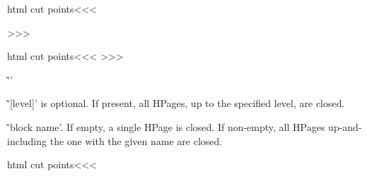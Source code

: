 {{\<html cut points\><<<
\def\HPageButton{\strt:bt\ch:bbtf}
\def\ch:bbtf{\ifx -\:temp \expandafter\op:bbft
             \else \expandafter\:bbtf \fi}
\def\:bbtf[#1]#2{%
   \:hookI{BeforeHPageButton}{}{#2}%
   \hpg:wrn{#1}{#2}\HPageButton
   \TagFile{|<fr bt fl|>\:temp}%
   \edef\HP:file{\RefFile\:temp}%
   \def\:temp{#2}\ifx \:temp\empty 
   \else  \HP:Link#2\EndLink  \fi
   \:hookI{AfterHPageButton}{}{#2}%
   \csname AfterHPage\endcsname  }

\def\op:bbft#1[#2]{%
   \:hookI{BeforeHPageButton}{}{}%
   \edef\:temp{#2}%
   \ifx \:temp\empty \:warning{\string\HPageButton-[]?}\fi
   \TagFile{|<fr bt fl|>\:temp}%
   \edef\HP:file{\RefFile\:temp}%
   \HP:Link%
   \def\ContHPage{\EndLink
      \:hookI{AfterHPageButton}{}{}%
      \csname AfterHPage\endcsname  }}
>>>


\<html cut points\><<<
\def\BeginHPage{\futurelet\:temp\ch:bbbt}
\def\ch:bbbt{%
   |<entring file of hpage|>%
   \NewFileName\HP:file   \Save:Link\HP:file 
   \ifx -\:temp  \expandafter\op:bbbt
   \else         \expandafter\:bbbt   \fi}
\def\:bbbt[#1]#2{%
   \PushStack\:btid{#1}%
   \:btfile{#2}%
   \:buttrc\BeginHPage{[#1]{#2}}%
   \PushStack\:afterbt\empty 
   \hpg:wrn{#1}{#2}\BeginHPage    \Save:HPageTag\:temp
   \Save:HPage{#2}%
   \TagFile{\:temp}}
\def\op:bbbt#1[#2]{%
   \PushStack\:btid{#2}%
   \:hookI{AfterHPageButton}{}{}%
   \:btfile{}%
   \:buttrc\BeginHPage{[#2]}%
   \PushStack\:afterbt\empty    \edef\:temp{#2}%
   \ifx \:temp\empty \:warning{\string\BeginHPage-[]?}\fi
   \Save:HPageTag\:temp   \Save:HPage{}%
   \TagFile{\:temp}}
>>>






\`''

\List{$\bullet$}

\item \`'[level]' is optional. If present, all HPages, up to the
specified level, are closed.

\item \`'block name'. If empty, a single HPage is closed. If
non-empty, all HPages up-and-including the one with the given name
are closed.

\EndList

\<html cut points\><<<
\def\EndHPage{\futurelet\:temp\chEnd:HPage}
\def\chEnd:HPage{\ifx  [\:temp  \expandafter\opEnd:HPage
              \else          \expandafter\End:HPage   \fi}
\def\opEnd:HPage[#1]{%
   \ifnum  #1>\HPageDepth\space
      \:warning{\string\EndHPage[#1]?}%
      \let\:temp|=\:gobble 
   \else \ifnum  #1<\HPageDepth\space
      \def\:temp{\:EndHPage\EndHPage[#1]{}}%
   \else \let\:temp|=\End:HPage \fi \fi
   \:temp }

}}
